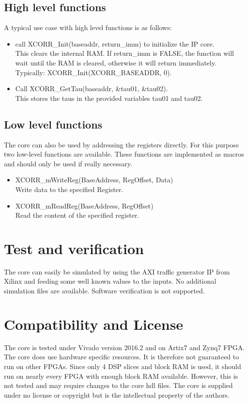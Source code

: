 \subsection{High level functions}
A typical use case with high level functions is as follows:
\begin{itemize}
	\item call XCORR\_Init(baseaddr, return\_imm) to initialize the IP core. \\
	This clears the internal RAM. If return\_imm is FALSE, the function will wait until the RAM is cleared, otherwise it will return immediately.\\
	Typically: XCORR\_Init(XCORR\_BASEADDR, 0).
	\item Call XCORR\_GetTau(baseaddr, \&tau01, \&tau02). \\
	This stores the taus in the provided variables tau01 and tau02.
\end{itemize}


\subsection{Low level functions}
The core can also be used by addressing the registers directly.
For this purpose two low-level functions are available.
These functions are implemented as macros and should only be used if really necessary.

\begin{itemize}
	\item XCORR\_mWriteReg(BaseAddress, RegOffset, Data) \\
		Write data to the specified Register. 
	\item XCORR\_mReadReg(BaseAddress, RegOffset) \\		
		Read the content of the specified register.
\end{itemize}

\section{Test and verification}
\label{sec::test}

The core can easily be simulated by using the AXI traffic generator IP from Xilinx and feeding some well known values to the inputs.
No additional simulation files are available.
Software verification is not supported.

\section{Compatibility and License}
The core is tested under Vivado version 2016.2 and on Artix7 and Zynq7 FPGA.
The core does use hardware specific resources.
It is therefore not guaranteed to run on other FPGAs.
Since only 4 DSP slices and block RAM is used, it should run on nearly every FPGA with enough block RAM available.
However, this is not tested and may require changes to the core hdl files.
The core is supplied under no license or copyright but is the intellectual property of the authors.


